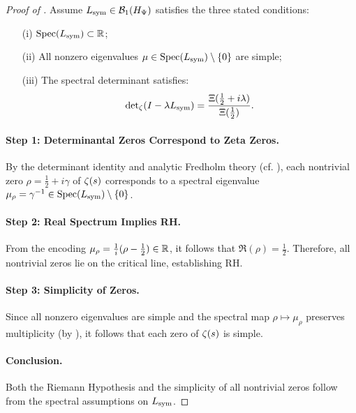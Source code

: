 \begin{proof}[Proof of ]
Assume \( L_{\mathrm{sym}} \in \mathcal{B}_1(H_{\Psi}) \) satisfies the three stated conditions:
\begin{enumerate}
  \item[\textup{(i)}] \( \operatorname{Spec}(L_{\mathrm{sym}}) \subset \mathbb{R} \);
  \item[\textup{(ii)}] All nonzero eigenvalues \( \mu \in \operatorname{Spec}(L_{\mathrm{sym}}) \setminus \{0\} \) are simple;
  \item[\textup{(iii)}] The spectral determinant satisfies:
  \[
  \det\nolimits_{\zeta}(I - \lambda L_{\mathrm{sym}}) = \frac{\Xi(\tfrac{1}{2} + i\lambda)}{\Xi(\tfrac{1}{2})}.
  \]
\end{enumerate}

\paragraph{Step 1: Determinantal Zeros Correspond to Zeta Zeros.}
By the determinant identity and analytic Fredholm theory (cf. ), each nontrivial zero \( \rho = \tfrac{1}{2} + i\gamma \) of \( \zeta(s) \) corresponds to a spectral eigenvalue \( \mu_\rho = \gamma^{-1} \in \operatorname{Spec}(L_{\mathrm{sym}}) \setminus \{0\} \).

\paragraph{Step 2: Real Spectrum Implies RH.}
From the encoding \( \mu_\rho = \tfrac{1}{i}(\rho - \tfrac{1}{2}) \in \mathbb{R} \), it follows that \( \Re(\rho) = \tfrac{1}{2} \). Therefore, all nontrivial zeros lie on the critical line, establishing RH.

\paragraph{Step 3: Simplicity of Zeros.}
Since all nonzero eigenvalues are simple and the spectral map \( \rho \mapsto \mu_\rho \) preserves multiplicity (by ), it follows that each zero of \( \zeta(s) \) is simple.

\paragraph{Conclusion.}
Both the Riemann Hypothesis and the simplicity of all nontrivial zeros follow from the spectral assumptions on \( L_{\mathrm{sym}} \).
\end{proof}
